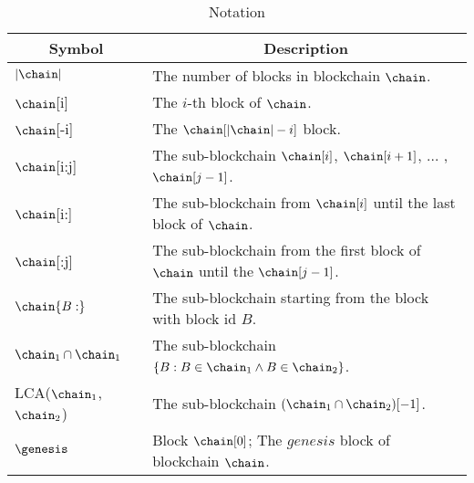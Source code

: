 \begin{table}[H]
\begin{tabular}{ll}
\hline
\multicolumn{1}{|c|}{Symbol} & \multicolumn{1}{c|}{Description}\\ \hline
$|\chain|$           & The number of blocks in blockchain $\chain$. \\
$\chain${[}i{]}      & The $i$-th block of $\chain$. \\
$\chain${[}-i{]}     & The $\chain[|\chain|-i]$ block. \\
$\chain${[}i:j{]}    & The sub-blockchain $\chain[i]$, $\chain[i+1]$, ... , $\chain[j-1]$. \\
$\chain${[}i:{]}     & The sub-blockchain from $\chain[i]$ until the last block of $\chain$. \\
$\chain${[}:j{]}     & The sub-blockchain from the first block of $\chain$ until the $\chain[j-1]$. \\
$\chain\{B :\}$      & The sub-blockchain starting from the block with block id $B$. \\
$\chain_1 \cap \chain_1$  & The sub-blockchain $\{B : B \in \chain_1 \land B \in \chain_2 \}$. \\
LCA($\chain_1$, $\chain_2$) & The sub-blockchain $(\chain_1 \cap \chain_2)[-1]$. \\
$\genesis$           & Block $\chain[0]$; The $genesis$ block of blockchain $\chain$. \\
\end{tabular}
\caption{Notation}
\label{table:notation_nipopow}
\end{table}
